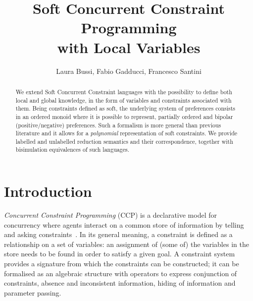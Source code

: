 \documentclass{llncs}
\begin{document}
\title{Soft Concurrent Constraint Programming\\ with Local Variables
}


\author{Laura Bussi, Fabio Gadducci, 
Francesco Santini
} 
	

\maketitle

\begin{abstract}
We extend Soft Concurrent Constraint languages with the possibility to define both local and global knowledge, in the form of variables and constraints associated with them. Being constraints defined as soft, the underlying system of preferences consists in an ordered monoid where it is possible to represent, partially ordered and bipolar (positive/negative) preferences. Such a formalism is more general than previous literature and it allows for a \emph{polynomial}  representation of soft constraints. We provide labelled and unlabelled reduction semantics and their correspondence, together with bisimulation equivalences of such languages.
\end{abstract}


\section{Introduction}\label{sec:intro}
\emph{Concurrent Constraint Programming} (CCP) is a declarative model for concurrency where agents interact on a common store of information by telling and asking constraints~\cite{emerging}.  In its general meaning, a constraint is defined as a relationship on a set of variables: an assignment of (some of) the variables in the store needs to be found in order to satisfy a given goal.  A constraint system provides a signature from which the constraints can be constructed;  it can be formalised as an algebraic structure with operators to express conjunction of constraints, absence and inconsistent information, hiding of information and parameter passing.
\end{document}
